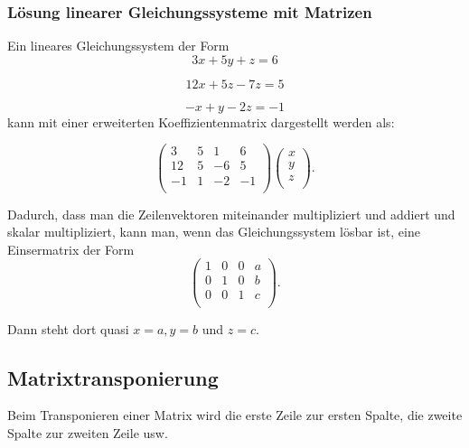 \documentclass{scrartcl}
\begin{document}
\subsubsection{Lösung linearer Gleichungssysteme mit Matrizen}

Ein lineares Gleichungssystem der Form 
\begin{equation}
	3x + 5y + z = 6
\end{equation}

\begin{equation}
	12x + 5z - 7z = 5
\end{equation}

\begin{equation}
	-x + y - 2z = -1
\end{equation}
kann mit einer erweiterten Koeffizientenmatrix dargestellt werden als:

\begin{equation}
	\left(
	\begin{array}{ccc|c}
		3 & 5 & 1 & 6\\
		12 & 5 & -6 & 5\\
		-1 & 1 & -2 & -1\\
	\end{array}
	\right)\begin{pmatrix*}
		x\\
		y\\
		z\\
	\end{pmatrix*}.
\end{equation}

Dadurch, dass man die Zeilenvektoren miteinander multipliziert und addiert und skalar multipliziert, kann man, wenn
das Gleichungssystem lösbar ist, eine Einsermatrix der Form
\begin{equation}
	\left(
	\begin{array}{ccc|c}
		1 & 0 & 0 & a\\
		0 & 1 & 0 & b\\
		0 & 0 & 1 & c\\
	\end{array}
	\right).
\end{equation}

Dann steht dort quasi $x = a, y = b$ und $z = c$.

\subsection{Matrixtransponierung}

Beim Transponieren einer Matrix wird die erste Zeile zur ersten Spalte, die zweite Spalte zur zweiten Zeile usw.
\end{document}
